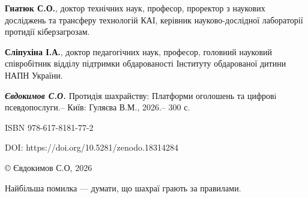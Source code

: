 \begin{titlepage}
{\small \textbf{Гнатюк С.О.}, доктор технічних наук, професор, проректор з наукових досліджень та трансферу технологій КАІ, керівник науково-дослідної лабораторії протидії кіберзагрозам.} \par

{\small \textbf{Сліпухіна І.А.}, доктор педагогічних наук, професор, головний науковий співробітник відділу підтримки обдарованості Інституту обдарованої дитини НАПН України.} \par


\vspace{3mm}
{\footnotesize \textbf{\textit{Євдокимов С.О.}} Протидія шахрайству: Платформи оголошень та цифровi псевдопослуги.– Київ: Гуляєва В.М., 2026.– 300 с.} \par
\vspace{2mm}

{\footnotesize 

ISBN 978-617-8181-77-2 \par

DOI: https://doi.org/10.5281/zenodo.18314284


}

\vfill
{\small © Євдокимов С.О, 2026}
\end{titlepage}
\clearpage

\clearpage
\thispagestyle{empty} %
\null
\vfill %

\begin{center}
    \begin{minipage}{0.75\textwidth}
        \centering
        \itshape %
        \large   %
        \setlength{\parskip}{1.5em} %
        
        \linespread{1.2}\selectfont 

        Найбільша помилка — думати, що шахраї грають за правилами.
        
        \vspace{2em} %
        
    \end{minipage}
\end{center}

\vfill %
\clearpage

